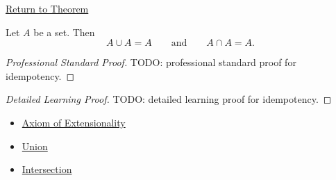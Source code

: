 \newpage
{}
\label{prf:idempotency}

\begin{remark*}[Return]
\hyperref[thm:idempotency]{Return to Theorem}
\end{remark*}

\begin{theorem*}
Let $A$ be a set. Then
\[
A\cup A=A
\qquad\text{and}\qquad
A\cap A=A.
\]
\end{theorem*}

\begin{proof}[Professional Standard Proof]
\LRAProofBodyStart
TODO: professional standard proof for idempotency.
\end{proof}

\begin{proof}[Detailed Learning Proof]
\LRAProofBodyStart
TODO: detailed learning proof for idempotency.
\end{proof}

\begin{remark*}
\end{remark*}

\begin{dependencies}
\begin{itemize}
  \item \hyperref[ax:extensionality]{Axiom of Extensionality}
  \item \hyperref[def:union]{Union}
  \item \hyperref[def:intersection]{Intersection}
\end{itemize}
\end{dependencies}

\clearpage
